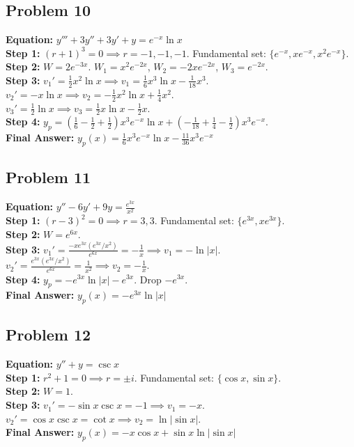 \documentclass[11pt]{article}
\begin{document}
\subsection*{Problem 10}
\textbf{Equation:} $y''' + 3y'' + 3y' + y = e^{-x} \ln x$ \\
\textbf{Step 1:} $(r+1)^3 = 0 \implies r = -1, -1, -1$. Fundamental set: $\{e^{-x}, xe^{-x}, x^2e^{-x}\}$. \\
\textbf{Step 2:} $W = 2e^{-3x}$. $W_1 = x^2e^{-2x}$, $W_2 = -2xe^{-2x}$, $W_3 = e^{-2x}$. \\
\textbf{Step 3:} $v_1' = \frac{1}{2}x^2\ln x \implies v_1 = \frac{1}{6}x^3\ln x - \frac{1}{18}x^3$. \\
$v_2' = -x\ln x \implies v_2 = -\frac{1}{2}x^2\ln x + \frac{1}{4}x^2$. \\
$v_3' = \frac{1}{2}\ln x \implies v_3 = \frac{1}{2}x\ln x - \frac{1}{2}x$. \\
\textbf{Step 4:} $y_p = (\frac{1}{6} - \frac{1}{2} + \frac{1}{2})x^3e^{-x}\ln x + (-\frac{1}{18} + \frac{1}{4} - \frac{1}{2})x^3e^{-x}$. \\
\textbf{Final Answer:} $y_p(x) = \frac{1}{6}x^3e^{-x}\ln x - \frac{11}{36}x^3e^{-x}$

\subsection*{Problem 11}
\textbf{Equation:} $y'' - 6y' + 9y = \frac{e^{3x}}{x^2}$ \\
\textbf{Step 1:} $(r-3)^2 = 0 \implies r = 3, 3$. Fundamental set: $\{e^{3x}, xe^{3x}\}$. \\
\textbf{Step 2:} $W = e^{6x}$. \\
\textbf{Step 3:} $v_1' = \frac{-xe^{3x}(e^{3x}/x^2)}{e^{6x}} = -\frac{1}{x} \implies v_1 = -\ln|x|$. \\
$v_2' = \frac{e^{3x}(e^{3x}/x^2)}{e^{6x}} = \frac{1}{x^2} \implies v_2 = -\frac{1}{x}$. \\
\textbf{Step 4:} $y_p = -e^{3x}\ln|x| - e^{3x}$. Drop $-e^{3x}$. \\
\textbf{Final Answer:} $y_p(x) = -e^{3x}\ln|x|$

\subsection*{Problem 12}
\textbf{Equation:} $y'' + y = \csc x$ \\
\textbf{Step 1:} $r^2 + 1 = 0 \implies r = \pm i$. Fundamental set: $\{\cos x, \sin x\}$. \\
\textbf{Step 2:} $W = 1$. \\
\textbf{Step 3:} $v_1' = -\sin x \csc x = -1 \implies v_1 = -x$. \\
$v_2' = \cos x \csc x = \cot x \implies v_2 = \ln|\sin x|$. \\
\textbf{Final Answer:} $y_p(x) = -x\cos x + \sin x\ln|\sin x|$
\end{document}
